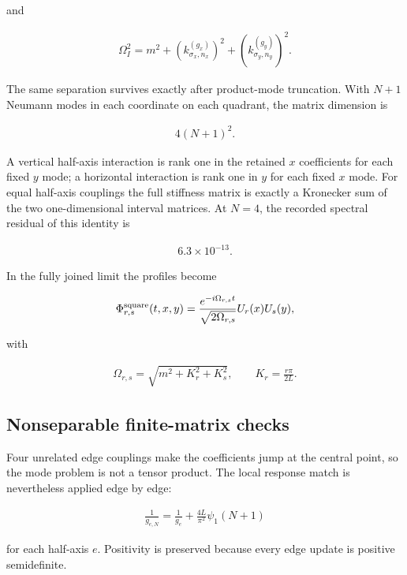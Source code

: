 and

\begin{align}
\Omega_I^2
=m^2+\left(k_{\sigma_x,n_x}^{(g_x)}\right)^2
+\left(k_{\sigma_y,n_y}^{(g_y)}\right)^2.
\end{align}

The same separation survives exactly after product-mode truncation. With $N+1$ Neumann modes in each coordinate on each quadrant, the matrix dimension is

\begin{align}
4(N+1)^2.
\end{align}

A vertical half-axis interaction is rank one in the retained $x$ coefficients for each fixed $y$ mode; a horizontal interaction is rank one in $y$ for each fixed $x$ mode. For equal half-axis couplings the full stiffness matrix is exactly a Kronecker sum of the two one-dimensional interval matrices. At $N=4$, the recorded spectral residual of this identity is

\begin{align}
6.3\times10^{-13}.
\end{align}

In the fully joined limit the profiles become

\begin{align}
\Phi_{r,s}^{\rm square}(t,x,y)
=\frac{e^{-i\Omega_{r,s}t}}{\sqrt{2\Omega_{r,s}}}
U_r(x)U_s(y),
\end{align}

with

\begin{align}
\Omega_{r,s}
=\sqrt{m^2+K_r^2+K_s^2},
\qquad
K_r=\frac{r\pi}{2L}.
\end{align}

\subsection{Nonseparable finite-matrix checks}\label{subsec:four-region-nonseparable}

Four unrelated edge couplings make the coefficients jump at the central point, so the mode problem is not a tensor product. The local response match is nevertheless applied edge by edge:

\begin{align}
\frac1{g_{e,N}}
=\frac1{g_e}+\frac{4L}{\pi^2}\psi_1(N+1)
\end{align}

for each half-axis $e$. Positivity is preserved because every edge update is positive semidefinite.

